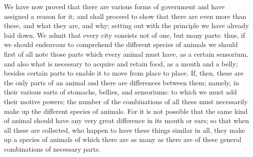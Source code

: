 We have now proved that there are various forms of government and have
assigned a reason for it; and shall proceed to show that there are even
more than these, and what they are, and why; setting out with the
principle we have already laid down. We admit that every city consists not
of one, but many parts: thus, if we should endeavour to comprehend the
different species of animals we should first of all note those parts which
every animal must have, as a certain sensorium, and also what is necessary
to acquire and retain food, as a mouth and a belly; besides certain parts
to enable it to move from place to place. If, then, these are the only
parts of an animal and there are differences between them; namely, in
their various sorts of stomachs, bellies, and sensoriums: to which we must
add their motive powers; the number of the combinations of all these must
necessarily make up the different species of animals. For it is not
possible that the same kind of animal should have any very great
difference in its mouth or ears; so that when all these are collected, who
happen to have these things similar in all, they make up a species of
animals of which there are as many as there are of these general
combinations of necessary parts.

